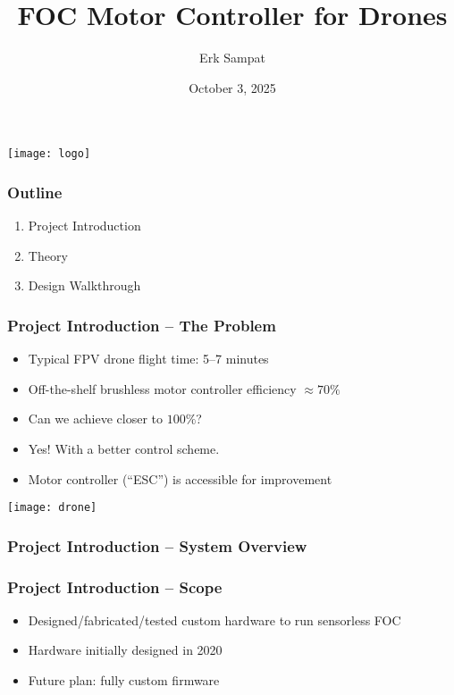 

\title{FOC Motor Controller for Drones}
\author{Erk Sampat}
\date{October 3, 2025}

\begin{frame}
	\begin{center}
		\texttt{[image: logo]}
	\end{center}
	\vskip-0.5in
	\titlepage
\end{frame}
\begin{frame}\frametitle{Outline}
	\begin{enumerate}
		\item Project Introduction
		\item Theory
		\item Design Walkthrough
	\end{enumerate}
\end{frame}
\begin{frame}\frametitle{Project Introduction -- The Problem}
	\begin{itemize}
		\item Typical FPV drone flight time: 5--7 minutes
		\item Off-the-shelf brushless motor controller efficiency $\approx 70\%$
		\item Can we achieve closer to $100\%$?
		\item Yes! With a better control scheme.
		\item Motor controller (``ESC'') is accessible for improvement
	\end{itemize}
	\begin{center}
		\texttt{[image: drone]}
	\end{center}
\end{frame}
\begin{frame}\frametitle{Project Introduction -- System Overview}
\end{frame}
\begin{frame}\frametitle{Project Introduction -- Scope}
	\begin{itemize}
		\item Designed/fabricated/tested custom hardware to run sensorless FOC
		\item Hardware initially designed in 2020
		\item Future plan: fully custom firmware
	\end{itemize}
	\begin{center}
	\end{center}
\end{frame}
